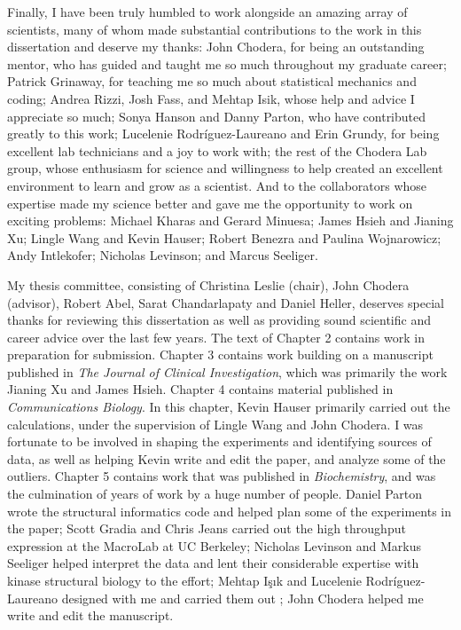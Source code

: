 \documentclass[phd,tocprelim]{cornell}
\begin{document}
\begin{acknowledgements}
Finally, I have been truly humbled to work alongside an amazing array of scientists, many of whom made substantial contributions to the work in this dissertation and deserve my thanks: John Chodera, for being an outstanding mentor, who has guided and taught me so much throughout my graduate career; Patrick Grinaway, for teaching me so much about statistical mechanics and coding; Andrea Rizzi, Josh Fass, and Mehtap Isik, whose help and advice I appreciate so much; Sonya Hanson and Danny Parton, who have contributed greatly to this work; Lucelenie Rodr\'{i}guez-Laureano and Erin Grundy, for being excellent lab technicians and a joy to work with; the rest of the Chodera Lab group, whose enthusiasm for science and willingness to help created an excellent environment to learn and grow as a scientist. And to the collaborators whose expertise made my science better and gave me the opportunity to work on exciting problems: Michael Kharas and Gerard Minuesa; James Hsieh and Jianing Xu; Lingle Wang and Kevin Hauser; Robert Benezra and Paulina Wojnarowicz; Andy Intlekofer; Nicholas Levinson; and Marcus Seeliger. 

My thesis committee, consisting of Christina Leslie (chair), John Chodera (advisor), Robert Abel, Sarat Chandarlapaty and Daniel Heller, deserves special thanks for reviewing this dissertation as well as providing sound scientific and career advice over the last few years. The text of Chapter 2 contains work in preparation for submission. Chapter 3 contains work building on a manuscript published in \emph{The Journal of Clinical Investigation}, which was primarily the work Jianing Xu and James Hsieh.  Chapter 4 contains material published in \emph{Communications Biology}. In this chapter, Kevin Hauser primarily carried out the calculations, under the supervision of Lingle Wang and John Chodera. I was fortunate to be involved in shaping the experiments and identifying sources of data, as well as helping Kevin write and edit the paper, and analyze some of the outliers. Chapter 5 contains work that was published in \emph{Biochemistry}, and was the culmination of years of work by a huge number of people. Daniel Parton wrote the structural informatics code and helped plan some of the experiments in the paper; Scott Gradia and Chris Jeans carried out the high throughput expression at the MacroLab at UC Berkeley; Nicholas Levinson and Markus Seeliger helped interpret the data and lent their considerable expertise with kinase structural biology to the effort; Mehtap Işık and Lucelenie Rodr\'{i}guez-Laureano designed with me and carried them out ; John Chodera helped me write and edit the manuscript. 





\end{acknowledgements}
\end{document}
